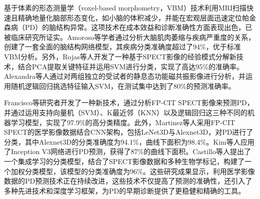 基于体素的形态测量学（voxel-based morphometry，VBM）技术利用MRI扫描快速且精确地量化脑部形态变化，如小脑的体积减少，并能在宏观层面迅速定位帕金森病（PD）的脑结构异常\cite{li2018patterns,de2017loss}。这项技术在成本效益和诊断准确性方面表现出色，已被临床研究所证实。Amoroso等学者\cite{amoroso2018complex}通过分析大脑肌肉萎缩与疾病严重度的关系，创建了一套全面的脑结构网络模型，其疾病分类准确度超过了94\%，优于标准VBM分析。另外，Rojas等人开发了一种基于SPECT影像的经验模式分解新技术\cite{rojas2013application}，结合PCA提取关键特征并运用SVM进行分类，实现了高达95\%的准确率。Alexandra等人\cite{abos2017discriminating}通过对两组独立的受试者的静息态功能磁共振影像进行分析，并运用随机逻辑回归挑选特征输入SVM，在测试集中达到了80\%的预测准确率。

Francisco等研究者\cite{oliveira2018extraction}开发了一种新技术，通过分析FP-CIT SPECT影像来预测PD，并通过运用支持向量机（SVM）、K最近邻（KNN）以及逻辑回归这三种不同的机器学习模型，实现了97.9\%的高分类精度。此外，Martinez等人\cite{martinez2018convolutional}采用FP-CIT SPECT的医学影像数据结合CNN架构，包括LeNet3D与Alexnet3D，对PD进行了分类，其中Alexnet3D的分类准确度为94.1\%，曲线下面积为98.4\%。Kim等人\cite{kim2018artificial}应用了Inception V3网络进行PD预测，获得了87\%的曲线下面积。Castillo等人\cite{castillo2018robust}提出了一个集成学习的分类模型，结合了SPECT影像数据和多种生物学标记，构建了一个加权分类模型，该模型的分类准确度为96\%。这些研究成果显示，利用医学影像数据的PD预测技术正在持续改进，这些技术不仅提高了预测的准确性，还引入了多种先进技术和深度学习框架，为PD的早期诊断提供了更稳健和精确的工具。


